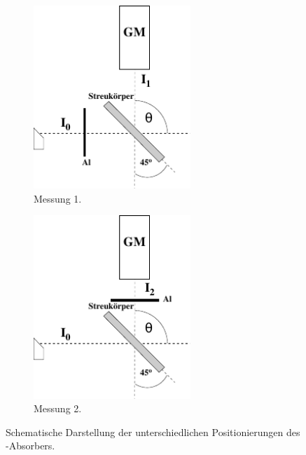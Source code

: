     \begin{figure}[H]
        \centering
        \begin{subfigure}{0.4\textwidth}
            \centering
            \includegraphics[width=0.65\textwidth]{content/img/Abb_3a.pdf}
            \caption{Messung 1. \cite{versuchsanleitung}}
            \label{fig:aufbau_transmission_a}
        \end{subfigure}
        \begin{subfigure}{0.4\textwidth}
            \centering
            \includegraphics[width=0.65\textwidth]{content/img/Abb_3b.pdf}
            \caption{Messung 2. \cite{versuchsanleitung}}
            \label{fig:aufbau_transmission_b}
        \end{subfigure}
        \caption{Schematische Darstellung der unterschiedlichen Positionierungen des -Absorbers.}
    \end{figure}

